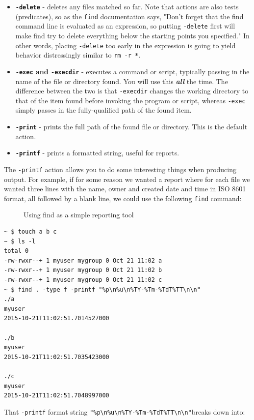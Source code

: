 \documentclass[10pt,]{book}
\numberwithin{figure}{chapter}
\DeclareRobustCommand{\drcap}[1]{\begin{figure}[H]\caption{#1}\end{figure}}
\begin{document}
\begin{itemize}
\item
  \textbf{\texttt{-delete}} - deletes any files matched so far. Note
  that actions are also tests (predicates), so as the \texttt{find}
  documentation says, "Don't forget that the find command line is
  evaluated as an expression, so putting \texttt{-delete} first will
  make find try to delete everything below the starting points you
  specified." In other words, placing \texttt{-delete} too early in the
  expression is going to yield behavior distressingly similar to
  \texttt{rm -r *}.
\item
  \textbf{\texttt{-exec} and \texttt{-execdir}} - executes a command or
  script, typically passing in the name of the file or directory found.
  You will use this \textbf{\emph{all}} the time. The difference between
  the two is that \texttt{-execdir} changes the working directory to
  that of the item found before invoking the program or script, whereas
  \texttt{-exec} simply passes in the fully-qualified path of the found
  item.
\item
  \textbf{\texttt{-print}} - prints the full path of the found file or
  directory. This is the default action.
\item
  \textbf{\texttt{-printf}} - prints a formatted string, useful for
  reports.
\end{itemize}

The \texttt{-printf} action allows you to do some interesting things
when producing output. For example, if for some reason we wanted a
report where for each file we wanted three lines with the name, owner
and created date and time in ISO 8601 format, all followed by a blank
line, we could use the following \texttt{find} command:

\drcap{Using find as a simple reporting tool}

\begin{verbatim}
~ $ touch a b c
~ $ ls -l
total 0
-rw-rwxr--+ 1 myuser mygroup 0 Oct 21 11:02 a
-rw-rwxr--+ 1 myuser mygroup 0 Oct 21 11:02 b
-rw-rwxr--+ 1 myuser mygroup 0 Oct 21 11:02 c
~ $ find . -type f -printf "%p\n%u\n%TY-%Tm-%TdT%TT\n\n"
./a
myuser
2015-10-21T11:02:51.7014527000

./b
myuser
2015-10-21T11:02:51.7035423000

./c
myuser
2015-10-21T11:02:51.7048997000
\end{verbatim}

That \texttt{-printf} format string
\texttt{"\%p\textbackslash{}n\%u\textbackslash{}n\%TY-\%Tm-\%TdT\%TT\textbackslash{}n\textbackslash{}n"}breaks
down into:
\end{document}
